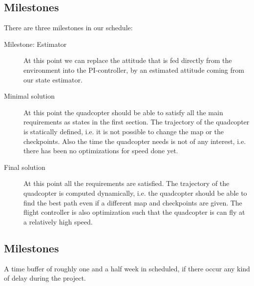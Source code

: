 \documentclass[a4paper,footsepline]{scrartcl}
\begin{document}
\subsection*{Milestones}
There are three milestones in our schedule:
\begin{description}
	\item[Milestone: Estimator] At this point we can replace the attitude that is fed directly from the environment into the PI-controller, by an estimated attitude coming from our state estimator.
	\item[Minimal solution] At this point the quadcopter should be able to satisfy all the main requirements as states in the first section. The trajectory of the quadcopter is statically defined, i.e. it is not possible to change the map or the checkpoints. Also the time the quadcopter needs is not of any interest, i.e. there has been no optimizations for speed done yet.
	\item[Final solution] At this point all the requirements are satisfied. The trajectory of the quadcopter is computed dynamically, i.e. the quadcopter should be able to find the best path even if a different map and checkpoints are given. The flight controller is also optimization such that the quadcopter is can fly at a relatively high speed.
\end{description}
\subsection*{Milestones}
A time buffer of roughly one and a half week in scheduled, if there occur any kind of delay during the project.
\end{document}
